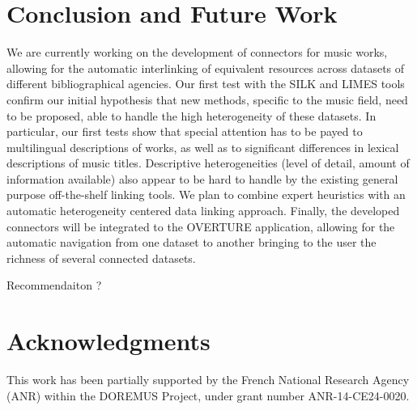 \documentclass[runningheads,a4paper]{llncs}
\begin{document}


\section{Conclusion and Future Work}
\label{sec:conclusion}
We are currently working on the development of connectors for music works, allowing for the automatic interlinking of equivalent resources across datasets of different bibliographical agencies. Our first test with the SILK \cite{jentzsch2010silk} and LIMES \cite{ngomo2011limes} tools confirm our initial hypothesis that new methods, specific to the music field, need to be proposed, able to handle the high heterogeneity of these datasets. In particular, our first tests show that special attention has to be payed to multilingual descriptions of works, as well as to significant differences in lexical descriptions of music titles. Descriptive heterogeneities (level of detail, amount of information available) also appear to be hard to handle by the existing general purpose off-the-shelf linking tools. We plan to combine expert heuristics with an automatic heterogeneity centered data linking approach. Finally, the developed connectors will be integrated to the OVERTURE application, allowing for the automatic navigation from one dataset to another bringing to the user the richness of several connected datasets.

Recommendaiton ?

\section*{Acknowledgments}
This work has been partially supported by the French National Research Agency (ANR) within the DOREMUS Project, under grant number ANR-14-CE24-0020.



\end{document}
